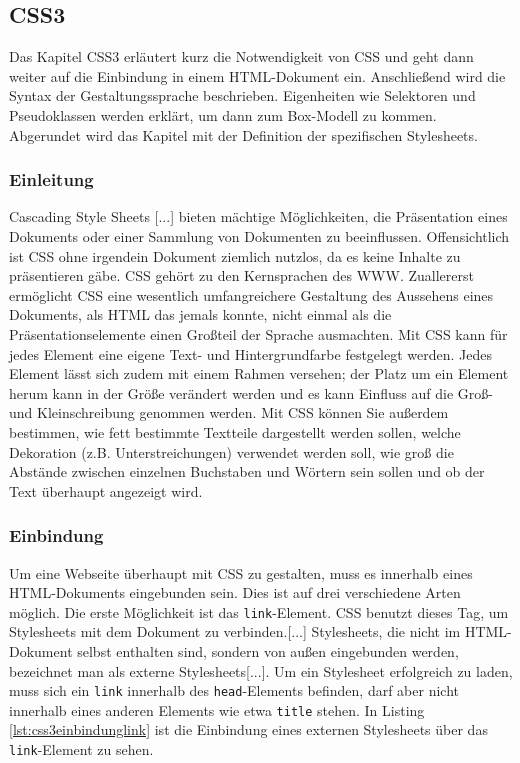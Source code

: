 \subsection{CSS3}
Das Kapitel CSS3 erläutert kurz die Notwendigkeit von CSS und geht dann weiter auf die Einbindung in einem HTML-Dokument ein. Anschließend wird die Syntax der Gestaltungssprache beschrieben. Eigenheiten wie Selektoren und Pseudoklassen werden erklärt, um dann zum Box-Modell zu kommen. Abgerundet wird das Kapitel mit der Definition der spezifischen Stylesheets.

\subsubsection{Einleitung}
\glqq Cascading Style Sheets [...] bieten mächtige Möglichkeiten, die Präsentation eines Dokuments oder einer Sammlung von Dokumenten zu beeinflussen. Offensichtlich ist CSS ohne irgendein Dokument ziemlich nutzlos, da es keine Inhalte zu präsentieren gäbe.\grqq{}\cite[S.1]{MeyeCasc2005} CSS gehört zu den Kernsprachen des WWW. \glqq Zuallererst ermöglicht CSS eine wesentlich umfangreichere Gestaltung des Aussehens eines Dokuments, als HTML das jemals konnte, nicht einmal als die Präsentationselemente einen Großteil der Sprache ausmachten. Mit CSS kann für jedes Element eine eigene Text- und Hintergrundfarbe festgelegt werden. Jedes Element lässt sich zudem mit einem Rahmen versehen; der Platz um ein Element herum kann in der Größe verändert werden und es kann Einfluss auf die Groß- und Kleinschreibung genommen werden. Mit CSS können Sie außerdem bestimmen, wie fett bestimmte Textteile dargestellt werden sollen, welche Dekoration (z.B. Unterstreichungen) verwendet werden soll, wie groß die Abstände zwischen einzelnen Buchstaben und Wörtern sein sollen und ob der Text überhaupt angezeigt wird.\grqq{}\cite[S.4]{MeyeCasc2005}

\subsubsection{Einbindung} Um eine Webseite überhaupt mit CSS zu gestalten, muss es innerhalb eines HTML-Dokuments eingebunden sein. Dies ist auf drei verschiedene Arten möglich. Die erste Möglichkeit ist das \texttt{link}-Element. \glqq CSS benutzt dieses Tag, um Stylesheets mit dem Dokument zu verbinden.[...] Stylesheets, die nicht im HTML-Dokument selbst enthalten sind, sondern von außen eingebunden werden, bezeichnet man als externe Stylesheets[...]. Um ein Stylesheet erfolgreich zu laden, muss sich ein \texttt{link} innerhalb des \texttt{head}-Elements befinden, darf aber nicht innerhalb eines anderen Elements wie etwa \texttt{title} stehen.\grqq{}\cite[S.14]{MeyeCasc2005} In Listing \ref{lst:css3einbindunglink} ist die Einbindung eines externen Stylesheets über das \texttt{link}-Element zu sehen.
	
